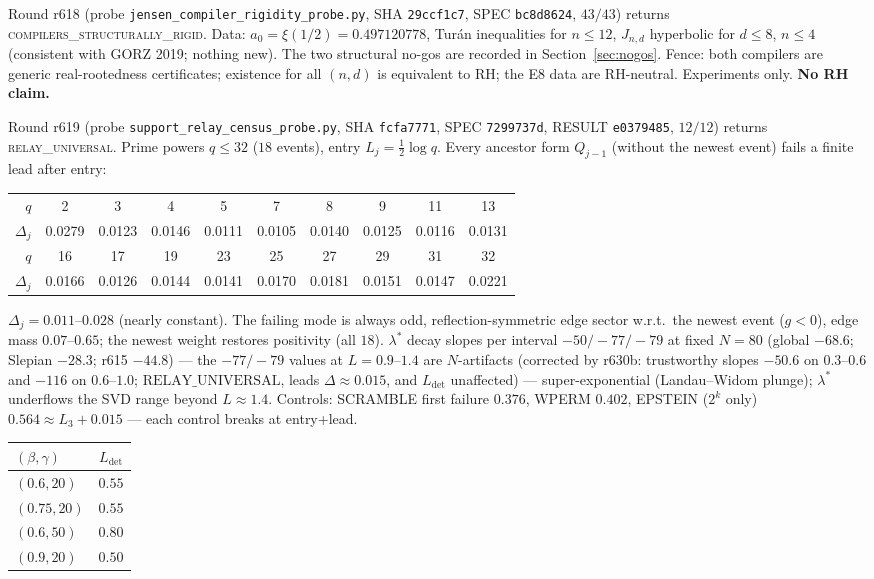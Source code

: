 \documentclass[11pt]{article}
\theoremstyle{definition}
\theoremstyle{remark}
\begin{document}
\noindent Round r618 (probe \texttt{jensen\_compiler\_rigidity\_probe.py},
SHA \texttt{29ccf1c7}, SPEC \texttt{bc8d8624}, $43/43$) returns
\textsc{compilers\_structurally\_rigid}.  Data:
$a_0=\xi(1/2)=0.497120778$, Tur\'an inequalities for $n\le 12$,
$J_{n,d}$ hyperbolic for $d\le 8$, $n\le 4$ (consistent with
GORZ 2019; nothing new).  The two structural no-gos are recorded in
Section~\ref{sec:nogos}.  Fence: both compilers are generic
real-rootedness certificates; existence for all $(n,d)$ is equivalent
to RH; the E8 data are RH-neutral.  Experiments only.
\textbf{No RH claim.}

\noindent Round r619 (probe \texttt{support\_relay\_census\_probe.py},
SHA \texttt{fcfa7771}, SPEC \texttt{7299737d}, RESULT
\texttt{e0379485}, $12/12$) returns \textsc{relay\_universal}.
Prime powers $q\le 32$ ($18$ events), entry
$L_j=\tfrac12\log q$.  Every ancestor form $Q_{j-1}$ (without
the newest event) fails a finite lead after entry:
\begin{center}\small
\begin{tabular}{@{}rccccccccc@{}}
\toprule
$q$ & 2 & 3 & 4 & 5 & 7 & 8 & 9 & 11 & 13\\
$\Delta_j$ & 0.0279 & 0.0123 & 0.0146 & 0.0111 & 0.0105 & 0.0140 & 0.0125 & 0.0116 & 0.0131\\
\midrule
$q$ & 16 & 17 & 19 & 23 & 25 & 27 & 29 & 31 & 32\\
$\Delta_j$ & 0.0166 & 0.0126 & 0.0144 & 0.0141 & 0.0170 & 0.0181 & 0.0151 & 0.0147 & 0.0221\\
\bottomrule
\end{tabular}
\end{center}
$\Delta_j=0.011$--$0.028$ (nearly constant).  The failing mode
is always odd, reflection-symmetric edge sector w.r.t.\ the
newest event ($g<0$), edge mass $0.07$--$0.65$; the newest
weight restores positivity (all $18$).  $\lambda^*$ decay
slopes per interval $-50/-77/-79$ at fixed $N=80$
(global $-68.6$; Slepian $-28.3$; r615 $-44.8$) --- the
$-77/-79$ values at $L=0.9$--$1.4$ are $N$-artifacts
(corrected by r630b: trustworthy slopes $-50.6$ on
$0.3$--$0.6$ and $-116$ on $0.6$--$1.0$;
$\mathrm{RELAY\_UNIVERSAL}$, leads $\Delta\approx 0.015$,
and $L_{\mathrm{det}}$ unaffected) --- super-exponential
(Landau--Widom plunge); $\lambda^*$ underflows the SVD range
beyond $L\approx 1.4$.  Controls: SCRAMBLE first failure $0.376$,
WPERM $0.402$, EPSTEIN ($2^k$ only) $0.564\approx L_3+0.015$
--- each control breaks at entry+lead.
\begin{center}\small
\begin{tabular}{@{}lc@{}}
\toprule
$(\beta,\gamma)$ & $L_{\mathrm{det}}$\\
\midrule
$(0.6,20)$ & $0.55$\\
$(0.75,20)$ & $0.55$\\
$(0.6,50)$ & $0.80$\\
$(0.9,20)$ & $0.50$\\
\bottomrule
\end{tabular}
\end{center}
\end{document}
